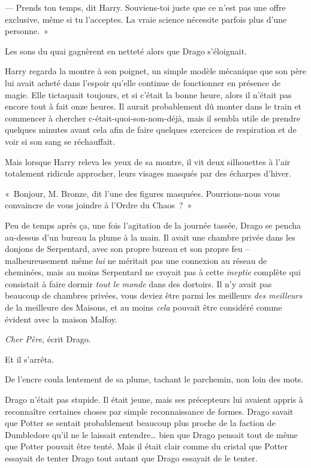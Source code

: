 --- Prends ton temps, dit Harry. Souviens-toi juste que ce n'est pas une offre exclusive, même si tu l'acceptes. La vraie science nécessite parfois plus d'une personne.~»

Les sons du quai gagnèrent en netteté alors que Drago s'éloignait.

Harry regarda la montre à son poignet, un simple modèle mécanique que son père lui avait acheté dans l'espoir qu'elle continue de fonctionner en présence de magie. Elle tictaquait toujours, et si c'était la bonne heure, alors il n'était pas encore tout à fait onze heures. Il aurait probablement dû monter dans le train et commencer à chercher c-était-quoi-son-nom-déjà, mais il sembla utile de prendre quelques minutes avant cela afin de faire quelques exercices de respiration et de voir si son sang se réchauffait.

Mais lorsque Harry releva les yeux de sa montre, il vit deux silhouettes à l'air totalement ridicule approcher, leurs visages masqués par des écharpes d'hiver.

«~Bonjour, M. Bronze, dit l'une des figures masquées. Pourrions-nous vous convaincre de vous joindre à l'Ordre du Chaos~?~»


Peu de temps après ça, une fois l'agitation de la journée tassée, Drago se pencha au-dessus d'un bureau la plume à la main. Il avait une chambre privée dans les donjons de Serpentard, avec son propre bureau et son propre feu -- malheureusement même \emph{lui} ne méritait pas une connexion au réseau de cheminées, mais au moins Serpentard ne croyait pas à cette \emph{ineptie} complète qui consistait à faire dormir \emph{tout le monde} dans des dortoirs. Il n'y avait pas beaucoup de chambres privées, vous deviez être parmi les meilleurs \emph{des meilleurs} de la meilleure des Maisons, et au moins \emph{cela} pouvait être considéré comme évident avec la maison Malfoy.

\emph{Cher Père}, écrit Drago.

Et il s'arrêta.

De l'encre coula lentement de sa plume, tachant le parchemin, non loin des mots.

Drago n'était pas stupide. Il était jeune, mais ses précepteurs lui avaient appris à reconnaître certaines choses par simple reconnaissance de formes. Drago savait que Potter se sentait probablement beaucoup plus proche de la faction de Dumbledore qu'il ne le laissait entendre… bien que Drago pensait tout de même que Potter pouvait être tenté. Mais il était clair comme du cristal que Potter essayait de tenter Drago tout autant que Drago essayait de le tenter.

